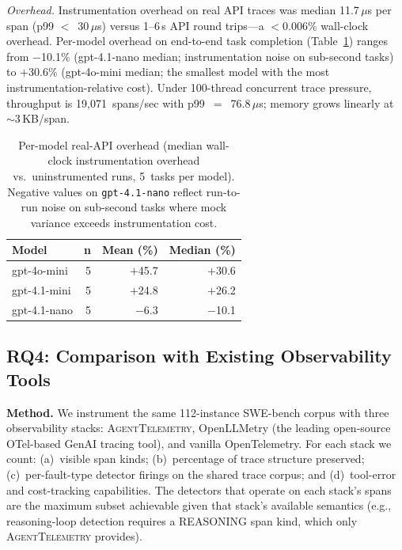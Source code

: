 \documentclass[sigconf,screen]{acmart}
\begin{document}
\emph{Overhead.} Instrumentation overhead on real API traces was
median 11.7\,$\mu$s per span (p99 $<$~30\,$\mu$s) versus 1--6\,s API
round trips---a $<$0.006\% wall-clock overhead.  Per-model overhead on
end-to-end task completion (Table~\ref{tab:real-overhead-bymodel})
ranges from $-$10.1\% (gpt-4.1-nano median; instrumentation noise on
sub-second tasks) to $+$30.6\% (gpt-4o-mini median; the smallest model
with the most instrumentation-relative cost).  Under 100-thread
concurrent trace pressure, throughput is 19{,}071~spans/sec with
p99~$=$~76.8\,$\mu$s; memory grows linearly at $\sim$3\,KB/span.

\begin{table}[t]
\centering
\scriptsize
\caption{Per-model real-API overhead (median wall-clock instrumentation
overhead vs.\ uninstrumented runs, 5~tasks per model).  Negative values
on \texttt{gpt-4.1-nano} reflect run-to-run noise on sub-second tasks
where mock variance exceeds instrumentation cost.}
\label{tab:real-overhead-bymodel}
\begin{tabular}{@{}lrrr@{}}
\toprule
\textbf{Model} & \textbf{n} & \textbf{Mean (\%)} & \textbf{Median (\%)} \\
\midrule
gpt-4o-mini  & 5 & $+$45.7 & $+$30.6 \\
gpt-4.1-mini & 5 & $+$24.8 & $+$26.2 \\
gpt-4.1-nano & 5 & $-$6.3  & $-$10.1 \\
\bottomrule
\end{tabular}
\end{table}

\subsection{RQ4: Comparison with Existing Observability Tools}
\label{sec:headtohead}

\textbf{Method.}
We instrument the same 112-instance SWE-bench corpus with three
observability stacks: \textsc{AgentTelemetry}, OpenLLMetry (the leading
open-source OTel-based GenAI tracing tool), and vanilla OpenTelemetry.
For each stack we count: (a)~visible span kinds; (b)~percentage of
trace structure preserved; (c)~per-fault-type detector firings on the
shared trace corpus; and (d)~tool-error and cost-tracking
capabilities.  The detectors that operate on each stack's spans are
the maximum subset achievable given that stack's available semantics
(e.g., reasoning-loop detection requires a REASONING span kind, which
only \textsc{AgentTelemetry} provides).
\end{document}
